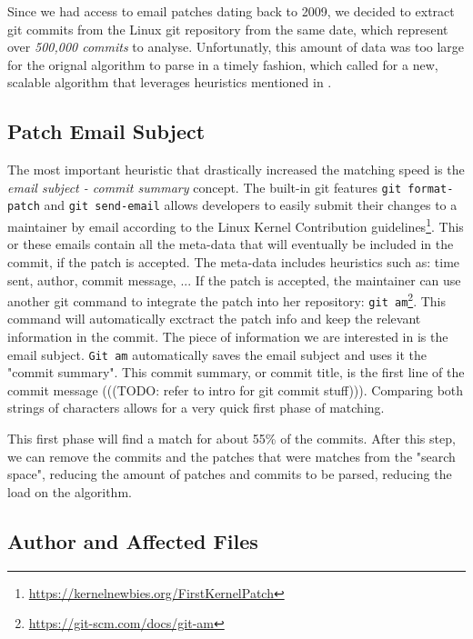 Since we had access to email patches dating back to 2009, we decided to extract git commits from the Linux git repository from the same date, which represent over \textit{500,000 commits} to analyse. Unfortunatly, this amount of data was too large for the orignal algorithm to parse in a timely fashion, which called for a new, scalable algorithm that leverages heuristics mentioned in \citep{msr13jojo,jiang14}.

\subsection{Patch Email Subject}

The most important heuristic that drastically increased the matching speed is the \textit{email subject - commit summary} concept. The built-in git features \texttt{git format-patch} and \texttt{git send-email} allows developers to easily submit their changes to a maintainer by email according to the Linux Kernel Contribution guidelines\footnote{\url{https://kernelnewbies.org/FirstKernelPatch}}. This or these emails contain all the meta-data that will eventually be included in the commit, if the patch is accepted. The meta-data includes heuristics such as: time sent, author, commit message, ... If the patch is accepted, the maintainer can use another git command to integrate the patch into her repository: \texttt{git am}\footnote{\url{https://git-scm.com/docs/git-am}}. This command will automatically exctract the patch info and keep the relevant information in the commit. The piece of information we are interested in is the email subject. \texttt{Git am} automatically saves the email subject and uses it the "commit summary". This commit summary, or commit title, is the first line of the commit message (((TODO: refer to intro for git commit stuff))). Comparing both strings of characters allows for a very quick first phase of matching.

This first phase will find a match for about 55\% of the commits. After this step, we can remove the commits and the patches that were matches from the "search space", reducing the amount of patches and commits to be parsed, reducing the load on the algorithm. 

\subsection{Author and Affected Files}

